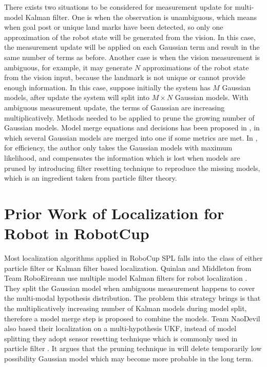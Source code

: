 There exists two situations to be considered for measurement update for multi-model Kalman filter. One is when the observation is unambiguous, which means when goal post or unique land marks have been detected, so only one approximation of the robot state will be generated from the vision. In this case, the measurement update will be applied on each Gaussian term and result in the same number of terms as before. Another case is when the vision measurement is ambiguous, for example, it may generate $N$ approximations of the robot state from the vision input, because the landmark is not unique or cannot provide enough information. In this case, suppose initially the system has $M$ Gaussian models, after update the system will split into $M \times N$ Gaussian models. With ambiguous measurement update, the terms of Gaussian are increasing multiplicatively. Methods needed to be applied to prune the growing number of Gaussian models. Model merge equations and decisions has been proposed in \cite{Quinlan2010}, in which several Gaussian models are merged into one if some metrics are met. In \cite{Jochmann2012}, for efficiency, the author only takes the Gaussian models with maximum likelihood, and compensates the information which is lost when models are pruned by introducing filter resetting technique to reproduce the missing models, which is an ingredient taken from particle filter theory.

\section{Prior Work of Localization for Robot in RobotCup}\label{sec:2.2}
Most localization algorithms applied in RoboCup \gls{SPL} falls into the class of either particle filter or Kalman filter based localization. Quinlan and Middleton from Team RoboEireann use multiple model Kalman filters for robot localization \cite{Quinlan2010}. They split the Gaussian model when ambiguous measurement happens to cover the multi-modal hypothesis distribution. The problem this strategy brings is that the multiplicatively increasing number of Kalman models during model split, therefore a model merge step is proposed to combine the models. Team NaoDevil also based their localization on a multi-hypothesis \gls{UKF}, instead of model splitting they adopt sensor resetting technique which is commonly used in particle filter \cite{Jochmann2012}. It argues that the  pruning technique in \cite{Quinlan2010} will delete temporarily low possibility Gaussian model which may become more probable in the long term.

